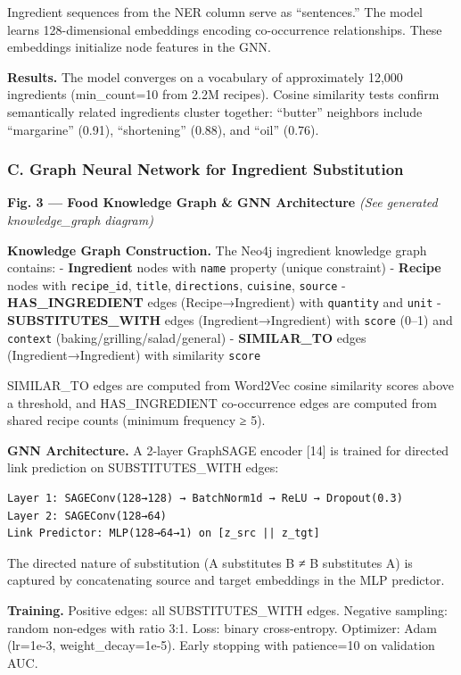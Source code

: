 \documentclass[
  10pt,
]{article}
\begin{document}
Ingredient sequences from the NER column serve as ``sentences.'' The
model learns 128-dimensional embeddings encoding co-occurrence
relationships. These embeddings initialize node features in the GNN.

\textbf{Results.} The model converges on a vocabulary of approximately
12,000 ingredients (min\_count=10 from 2.2M recipes). Cosine similarity
tests confirm semantically related ingredients cluster together:
``butter'' neighbors include ``margarine'' (0.91), ``shortening''
(0.88), and ``oil'' (0.76).

\subsubsection{C. Graph Neural Network for Ingredient
Substitution}\label{c.-graph-neural-network-for-ingredient-substitution}

\textbf{Fig. 3 --- Food Knowledge Graph \& GNN Architecture} \emph{(See
generated knowledge\_graph diagram)}

\textbf{Knowledge Graph Construction.} The Neo4j ingredient knowledge
graph contains: - \textbf{Ingredient} nodes with \texttt{name} property
(unique constraint) - \textbf{Recipe} nodes with \texttt{recipe\_id},
\texttt{title}, \texttt{directions}, \texttt{cuisine}, \texttt{source} -
\textbf{HAS\_INGREDIENT} edges (Recipe→Ingredient) with
\texttt{quantity} and \texttt{unit} - \textbf{SUBSTITUTES\_WITH} edges
(Ingredient→Ingredient) with \texttt{score} (0--1) and \texttt{context}
(baking/grilling/salad/general) - \textbf{SIMILAR\_TO} edges
(Ingredient→Ingredient) with similarity \texttt{score}

SIMILAR\_TO edges are computed from Word2Vec cosine similarity scores
above a threshold, and HAS\_INGREDIENT co-occurrence edges are computed
from shared recipe counts (minimum frequency ≥ 5).

\textbf{GNN Architecture.} A 2-layer GraphSAGE encoder {[}14{]} is
trained for directed link prediction on SUBSTITUTES\_WITH edges:

\begin{verbatim}
Layer 1: SAGEConv(128→128) → BatchNorm1d → ReLU → Dropout(0.3)
Layer 2: SAGEConv(128→64)
Link Predictor: MLP(128→64→1) on [z_src || z_tgt]
\end{verbatim}

The directed nature of substitution (A substitutes B ≠ B substitutes A)
is captured by concatenating source and target embeddings in the MLP
predictor.

\textbf{Training.} Positive edges: all SUBSTITUTES\_WITH edges. Negative
sampling: random non-edges with ratio 3:1. Loss: binary cross-entropy.
Optimizer: Adam (lr=1e-3, weight\_decay=1e-5). Early stopping with
patience=10 on validation AUC.
\end{document}
